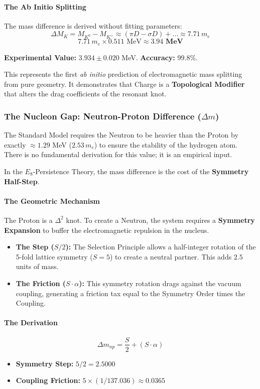 \paragraph{The Ab Initio Splitting} 
The mass difference is derived without fitting parameters:
\[ \Delta M_{K} = M_{K^0} - M_{K^+} \approx (\pi D - \sigma D) + \dots \approx 7.71 \, m_e \]
\[ 7.71 \, m_e \times 0.511 \text{ MeV} \approx \mathbf{3.94 \text{ MeV}} \]

\textbf{Experimental Value:} $3.934 \pm 0.020$ MeV. \textbf{Accuracy:} 99.8\%.

This represents the first \textit{ab initio} prediction of electromagnetic mass splitting from pure geometry. It demonstrates that Charge is a \textbf{Topological Modifier} that alters the drag coefficients of the resonant knot.

\subsubsection{The Nucleon Gap: Neutron-Proton Difference (\texorpdfstring{$\Delta m$}{Deltam})}

The Standard Model requires the Neutron to be heavier than the Proton by exactly $\approx 1.29$ MeV ($2.53 \, m_e$) to ensure the stability of the hydrogen atom. There is no fundamental derivation for this value; it is an empirical input.

In the $E_8$-Persistence Theory, the mass difference is the cost of the \textbf{Symmetry Half-Step}.

\paragraph{The Geometric Mechanism}
The Proton is a $\Delta^2$ knot. To create a Neutron, the system requires a \textbf{Symmetry Expansion} to buffer the electromagnetic repulsion in the nucleus.
\begin{itemize}
    \item \textbf{The Step ($S/2$):} The Selection Principle allows a half-integer rotation of the 5-fold lattice symmetry ($S=5$) to create a neutral partner. This adds $2.5$ units of mass.
    \item \textbf{The Friction ($S \cdot \alpha$):} This symmetry rotation drags against the vacuum coupling, generating a friction tax equal to the Symmetry Order times the Coupling.
\end{itemize}

\paragraph{The Derivation}
\[ \Delta m_{np} = \frac{S}{2} + (S \cdot \alpha) \]
\begin{itemize}
    \item \textbf{Symmetry Step:} $5/2 = \mathbf{2.5000}$
    \item \textbf{Coupling Friction:} $5 \times (1/137.036) \approx \mathbf{0.0365}$
\end{itemize}

